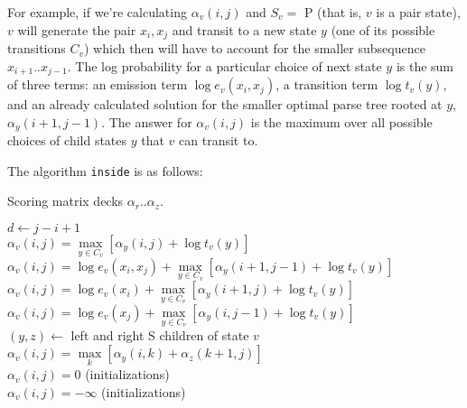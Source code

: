\documentclass[11pt]{article}
\begin{document}
For example, if we're calculating $\alpha_v(i,j)$ and $S_v =$ P (that
is, $v$ is a pair state), $v$ will generate the pair $x_i,x_j$ and
transit to a new state $y$ (one of its possible transitions $C_v$)
which then will have to account for the smaller subsequence
$x_{i+1}..x_{j-1}$. The log probability for a particular choice of
next state $y$ is the sum of three terms: an emission term $\log
e_v(x_i,x_j)$, a transition term $\log t_v(y)$, and an already
calculated solution for the smaller optimal parse tree rooted at $y$,
$\alpha_y(i+1,j-1)$. The answer for $\alpha_v(i,j)$ is the maximum
over all possible choices of child states $y$ that $v$ can transit to.

The algorithm \texttt{inside} is as follows:

\begin{algorithm}
         {Scoring matrix decks $\alpha_r..\alpha_z$.}
\begin{algtab*}
       $d \leftarrow j-i+1$\\
       	$\alpha_v(i,j) = \max\limits_{y \in C_v} \left[ \alpha_y(i,j)  + \log t_v(y) \right]$\\
	$\alpha_v(i,j) = \log e_v(x_i, x_j) + \max\limits_{y \in C_v} \left[ \alpha_y(i+1,j-1) + \log t_v(y) \right]$\\
        $\alpha_v(i,j) = \log e_v(x_i) + \max\limits_{y \in C_v} \left[ \alpha_y(i+1,j)   + \log t_v(y) \right]$\\
        $\alpha_v(i,j) = \log e_v(x_j) +      \max\limits_{y \in C_v} \left[ \alpha_y(i,j-1)   + \log t_v(y) \right]$ \\
        $(y,z) \leftarrow $ left and right S children of state $v$\\
        $\alpha_v(i,j) = \max\limits_k \left[ \alpha_y(i,k) + \alpha_z(k+1,j) \right]$ \\
	$\alpha_v(i,j) = 0$  (initializations)\\
       \algelse
	$\alpha_v(i,j) = -\infty$ (initializations)\\
\end{algtab*}
\end{algorithm}
\end{document}
